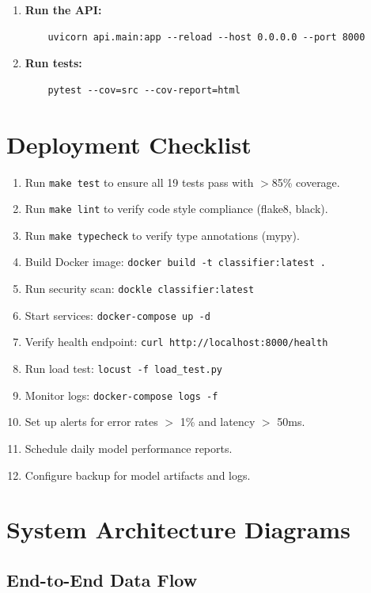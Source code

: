 \documentclass[12pt,a4paper]{article}
\begin{document}
\begin{enumerate}[leftmargin=*]
    \item \textbf{Run the API:}
    \begin{verbatim}
    uvicorn api.main:app --reload --host 0.0.0.0 --port 8000
    \end{verbatim}

    \item \textbf{Run tests:}
    \begin{verbatim}
    pytest --cov=src --cov-report=html
    \end{verbatim}
\end{enumerate}

\section{Deployment Checklist}
\label{app:deployment}

\begin{enumerate}[leftmargin=*]
    \item Run \texttt{make test} to ensure all 19 tests pass with $>$85\% coverage.
    \item Run \texttt{make lint} to verify code style compliance (flake8, black).
    \item Run \texttt{make typecheck} to verify type annotations (mypy).
    \item Build Docker image: \texttt{docker build -t classifier:latest .}
    \item Run security scan: \texttt{dockle classifier:latest}
    \item Start services: \texttt{docker-compose up -d}
    \item Verify health endpoint: \texttt{curl http://localhost:8000/health}
    \item Run load test: \texttt{locust -f load\_test.py}
    \item Monitor logs: \texttt{docker-compose logs -f}
    \item Set up alerts for error rates $>$ 1\% and latency $>$ 50ms.
    \item Schedule daily model performance reports.
    \item Configure backup for model artifacts and logs.
\end{enumerate}

\section{System Architecture Diagrams}
\label{app:architecture}

\subsection{End-to-End Data Flow}
\end{document}
